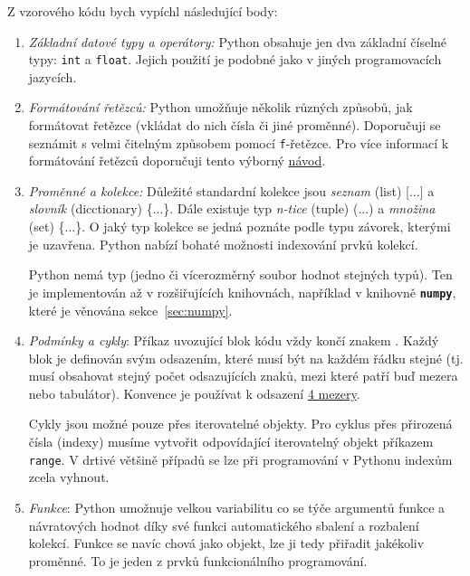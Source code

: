 \documentclass[a4paper,11pt,twoside]{article}
\def\code#1{\textnormal{\texttt{#1}}}
\def\file#1{\textnormal{\textbf{\texttt{#1}}}}
\theoremstyle{red}
\theoremstyle{green}
\begin{document}
    Z vzorového kódu bych vypíchl následující body:
    \begin{enumerate}
        \item 
            \emph{Základní datové typy a operátory:}
            Python obsahuje jen dva základní číselné typy: \code{int} a \code{float}.
            Jejich použití je podobné jako v jiných programovacích jazycích.

        \item
            \emph{Formátování řetězců:}
            Python umožňuje několik různých způsobů, jak formátovat řetězce (vkládat do nich čísla či jiné proměnné).
            Doporučuji se seznámit s velmi čitelným způsobem pomocí \code{f}-řetězce.            
            Pro více informací k formátování řetězců doporučuji tento výborný \href{https://pyformat.info}{návod}.
    
        \item
            \emph{Proměnné a kolekce:} 
            Důležité standardní kolekce jsou \emph{seznam} (list) [...] a \emph{slovník} (dicctionary) \{...\}.
            Dále existuje typ \emph{n-tice} (tuple) (...) a \emph{množina} (set) \{...\}.
            O jaký typ kolekce se jedná poznáte podle typu závorek, kterými je uzavřena.
            Python nabízí bohaté možnosti indexování prvků kolekcí.

            Python nemá typ  (jedno či vícerozměrný soubor hodnot stejných typů).
            Ten je implementován až v rozšiřujících knihovnách, například v knihovně \file{numpy}, které je věnována sekce~\ref{sec:numpy}.
            
        \item
            \emph{Podmínky a cykly}:
            Příkaz uvozující blok kódu vždy končí znakem \uv{:}.
            Každý blok je definován svým odsazením, které musí být na každém řádku stejné
            (tj. musí obsahovat stejný počet odsazujících znaků, mezi které patří buď mezera nebo tabulátor).
            Konvence je používat k odsazení \href{https://www.python.org/dev/peps/pep-0008/#indentation}{4 mezery}.

            Cykly jsou možné pouze přes iterovatelné objekty.
            Pro cyklus přes přirozená čísla (indexy) musíme vytvořit odpovídající iterovatelný objekt příkazem \code{range}.
            V drtivé většině případů se lze při programování v Pythonu indexům zcela vyhnout.

        \item 
            \emph{Funkce}: Python umožnuje velkou variabilitu co se týče argumentů funkce a návratových hodnot díky své funkci automatického sbalení a rozbalení kolekcí.
            Funkce se navíc chová jako objekt, lze ji tedy přiřadit jakékoliv proměnné.
            To je jeden z prvků funkcionálního programování.


\end{enumerate}
\end{document}
